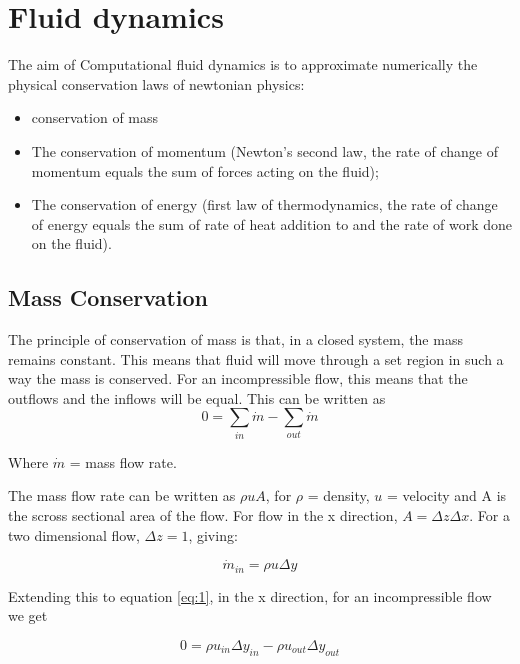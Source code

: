 \section{Fluid dynamics}
The aim of Computational fluid dynamics is to approximate numerically the physical conservation laws of newtonian physics:

\begin{itemize}
  \item conservation of mass

  \item The conservation of momentum (Newton’s second law, the rate of change of momentum equals the sum of forces acting on the fluid);

  \item The conservation of energy (first law of thermodynamics, the rate of change of energy equals the sum of rate of heat addition to and the rate of work done on the fluid).

\end{itemize}

    \subsection{Mass Conservation}

    The principle of conservation of mass is that, in a closed system, the mass remains constant. This means that fluid will move through a set region in such a way the mass is conserved. For an incompressible flow, this means that the outflows and the inflows will be equal. This can be written as
    \begin{equation} \label{eq:1}
      0 = \sum_{in} \dot{m} - \sum_{out} \dot{m}
    \end{equation} 

    Where $\dot{m}$ = mass flow rate.
    
    The mass flow rate can be written as $ \rho u A $,  for $\rho$ = density, $u$ = velocity and A is the scross sectional area of the flow. For flow in the x direction, $ A = \Delta z \Delta x $. For a two dimensional flow, $ \Delta z = 1 $, giving:

    \begin{equation} \label{eq:2}
      \dot{m}_{in} = \rho u \Delta y
    \end{equation}

    Extending this to equation \ref{eq:1}, in the x direction, for an incompressible flow we get

    \begin{equation} \label{eq:3}
      0 = \rho u_{in} \Delta y_{in} - \rho u_{out} \Delta y_{out}
    \end{equation}

